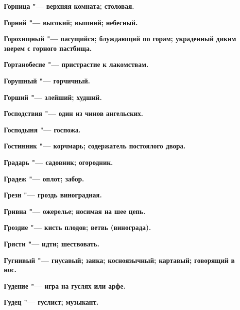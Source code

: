 \bfseries Горница \normalfont{} "--- верхняя комната; столовая. 




\bfseries Горний \normalfont{} "--- высокий; вышний; небесный. 




\bfseries Горохищный \normalfont{} "--- пасущийся; блуждающий по горам; украденный диким зверем с горного пастбища. 




\bfseries Гортанобесие \normalfont{} "--- пристрастие к лакомствам. 




\bfseries Горушный \normalfont{} "--- горчичный. 




\bfseries Горший \normalfont{} "--- злейший; худший. 




\bfseries Господствия \normalfont{} "--- один из чинов ангельских. 




\bfseries Господыня \normalfont{} "--- госпожа. 




\bfseries Гостинник \normalfont{} "--- корчмарь; содержатель постоялого двора. 




\bfseries Градарь \normalfont{} "--- садовник; огородник. 




\bfseries Градеж \normalfont{} "--- оплот; забор. 




\bfseries Грезн \normalfont{} "--- гроздь виноградная. 




\bfseries Гривна \normalfont{} "--- ожерелье; носимая на шее цепь. 




\bfseries Гроздие \normalfont{} "--- кисть плодов; ветвь (винограда). 




\bfseries Грясти \normalfont{} "--- идти; шествовать. 




\bfseries Гугнивый \normalfont{} "--- гнусавый; заика; косноязычный; картавый; говорящий в нос. 




\bfseries Гудение \normalfont{} "--- игра на гуслях или арфе. 




\bfseries Гудец \normalfont{} "--- гуслист; музыкант. 




